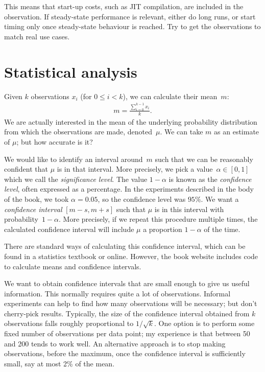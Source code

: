 This means that start-up costs, such as JIT compilation, are included in the
observation.  If steady-state performance is relevant, either do long runs, or
start timing only once steady-state behaviour is reached.  Try to get the
observations to match real use cases.


\section{Statistical analysis}

Given $k$ observations $x_i$ (for $0 \le i < k$), we can calculate their
mean~$m$:
%
\begin{eqnarray*}
m = \frac{\sum_{i = 0}^{k-1} x_i}{k}.
\end{eqnarray*}
%
We are actually interested in the mean of the underlying probability
distribution from which the observations are made, denoted~$\mu$.  
%
We can take $m$ as an estimate of $\mu$; but how accurate is it?

We would like to identify an interval around~$m$ such that we can be
reasonably confident that $\mu$ is in that interval.
%
More precisely, we pick a value~$\alpha \in [0,1]$ which we call the
\emph{significance level}.  The value $1-\alpha$ is known as the
\emph{confidence level}, often expressed as a percentage.  In the experiments
described in the body of the book, we took $\alpha = 0.05$, so the confidence
level was $95\%$.  We want a \emph{confidence interval} $[m-s, m+s]$ such that
$\mu$ is in this interval with probability~$1-\alpha$.
%
More precisely, if we repeat this procedure multiple times, the calculated
confidence interval will include $\mu$ a proportion $1-\alpha$ of the time. 

There are standard ways of calculating this confidence interval, which can be
found in a statistics textbook or online.  However, the book website includes
code to calculate means and confidence intervals. 

We want to obtain confidence intervals that are small enough to give us useful
information.  This normally requires quite a lot of observations.  Informal
experiments can help to find how many observations will be necessary; but
don't cherry-pick results.  Typically, the size of the confidence interval
obtained from $k$ observations falls roughly proportional to $1/\sqrt{k}$.
One option is to perform some fixed number of observations per data point; my
experience is that between 50 and 200 tends to work well.  An alternative
approach is to stop making observations, before the maximum, once the
confidence interval is sufficiently small, say at most 2\% of the mean.

